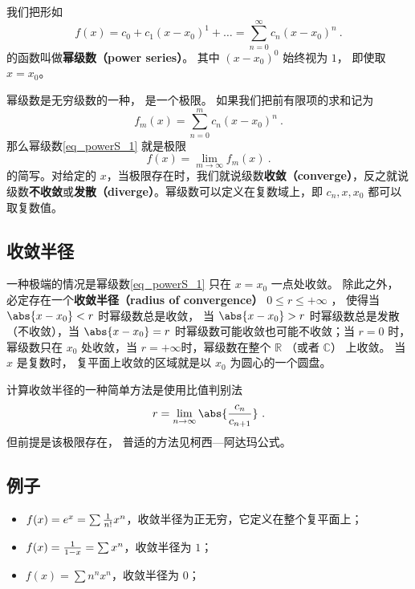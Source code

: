 

我们把形如
\begin{equation}\label{eq_powerS_1}
f(x) = c_0 + c_1 (x - x_0)^1 + \dots = \sum_{n=0}^\infty c_n (x-x_0)^n~.
\end{equation}
的函数叫做\textbf{幂级数（power series）}。 其中 $(x - x_0)^0$ 始终视为 $1$， 即使取 $x = x_0$。

幂级数是无穷级数的一种， 是一个极限。 如果我们把前有限项的求和记为
\begin{equation}
f_m(x) = \sum_{n=0}^m c_n (x-x_0)^n~.
\end{equation}
那么幂级数\autoref{eq_powerS_1} 就是极限
\begin{equation}
f(x) = \lim_{m\to\infty} f_m(x)~.
\end{equation}
的简写。对给定的 $x$，当极限存在时，我们就说级数\textbf{收敛（converge）}，反之就说级数\textbf{不收敛}或\textbf{发散（diverge）}。幂级数可以定义在复数域上，即 $c_n, x, x_0$ 都可以取复数值。

\subsection{收敛半径}
一种极端的情况是幂级数\autoref{eq_powerS_1} 只在 $x = x_0$ 一点处收敛。 除此之外， 必定存在一个\textbf{收敛半径（radius of convergence）} $0 \leq r \leq +\infty$ ， 使得当 $\abs{x-x_0} < r$ 时幂级数总是收敛， 当 $\abs{x-x_0} > r$ 时幂级数总是发散（不收敛），当 $\abs{x - x_0} = r$ 时幂级数可能收敛也可能不收敛；当 $r = 0$ 时，幂级数只在 $x_0$ 处收敛，当 $r = + \infty$时，幂级数在整个 $\mathbb{R}$ （或者 $\mathbb{C}$） 上收敛。 当 $x$ 是复数时， 复平面上收敛的区域就是以 $x_0$ 为圆心的一个圆盘。

计算收敛半径的一种简单方法是使用比值判别法
\begin{equation}
r = \lim_{n \to \infty} \abs{\frac{c_n}{c_{n+1}}}~.
\end{equation}
但前提是该极限存在， 普适的方法见柯西—阿达玛公式。

\subsection{例子}
\begin{example}{}
\begin{itemize}
\item $f(x) = e^x = \sum {1 \over n!} x^n$，收敛半径为正无穷，它定义在整个复平面上；
\item $f(x) = {1 \over 1 - x} = \sum x^n$，收敛半径为 $1$；
\item $f(x) = \sum n^n x^n$，收敛半径为 $0$；
\end{itemize}
\end{example}
